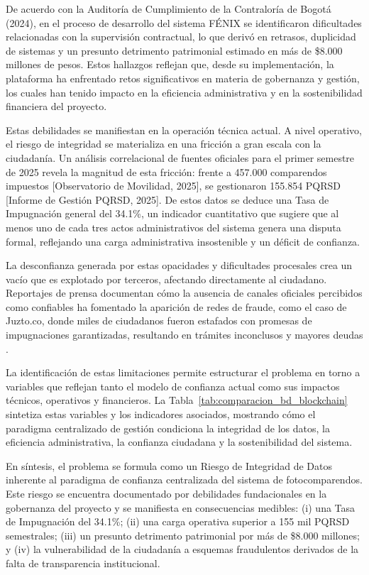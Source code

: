 De acuerdo con la Auditoría de Cumplimiento de la Contraloría de Bogotá (2024), en el proceso de desarrollo del sistema FÉNIX se identificaron dificultades relacionadas con la supervisión contractual, lo que derivó en retrasos, duplicidad de sistemas y un presunto detrimento patrimonial estimado en más de \$8.000 millones de pesos. Estos hallazgos reflejan que, desde su implementación, la plataforma ha enfrentado retos significativos en materia de gobernanza y gestión, los cuales han tenido impacto en la eficiencia administrativa y en la sostenibilidad financiera del proyecto.

Estas debilidades se manifiestan en la operación técnica actual. A nivel operativo, el riesgo de integridad se materializa en una fricción a gran escala con la ciudadanía. Un análisis correlacional de fuentes oficiales para el primer semestre de 2025 revela la magnitud de esta fricción: frente a 457.000 comparendos impuestos [Observatorio de Movilidad, 2025], se gestionaron 155.854 PQRSD [Informe de Gestión PQRSD, 2025]. De estos datos se deduce una Tasa de Impugnación general del 34.1\%, un indicador cuantitativo que sugiere que al menos uno de cada tres actos administrativos del sistema genera una disputa formal, reflejando una carga administrativa insostenible y un déficit de confianza.

La desconfianza generada por estas opacidades y dificultades procesales crea un vacío que es explotado por terceros, afectando directamente al ciudadano. Reportajes de prensa documentan cómo la ausencia de canales oficiales percibidos como confiables ha fomentado la aparición de redes de fraude, como el caso de Juzto.co, donde miles de ciudadanos fueron estafados con promesas de impugnaciones garantizadas, resultando en trámites inconclusos y mayores deudas \parencite{Semana_Juzto_2023}.

La identificación de estas limitaciones permite estructurar el problema en torno a variables que reflejan tanto el modelo de confianza actual como sus impactos técnicos, operativos y financieros. La Tabla~\ref{tab:comparacion_bd_blockchain} sintetiza estas variables y los indicadores asociados, mostrando cómo el paradigma centralizado de gestión condiciona la integridad de los datos, la eficiencia administrativa, la confianza ciudadana y la sostenibilidad del sistema.



En síntesis, el problema se formula como un Riesgo de Integridad de Datos inherente al paradigma de confianza centralizada del sistema de fotocomparendos. Este riesgo se encuentra documentado por debilidades fundacionales en la gobernanza del proyecto y se manifiesta en consecuencias medibles: (i) una Tasa de Impugnación del 34.1\%; (ii) una carga operativa superior a 155 mil PQRSD semestrales; (iii) un presunto detrimento patrimonial por más de \$8.000 millones; y (iv) la vulnerabilidad de la ciudadanía a esquemas fraudulentos derivados de la falta de transparencia institucional.


